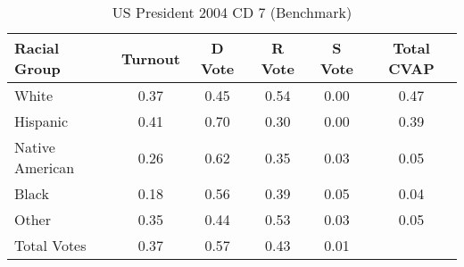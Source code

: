 \begin{table}[htb]
\begin{center}
\caption{US President 2004 CD 7 (Benchmark)}
\label{pres04_cvap_cd_7_benchmark}
\begin{tabular}{lccccc}
  \hline
Racial Group & Turnout & D Vote & R Vote & S Vote & Total CVAP \\ 
  \hline
White & 0.37 & 0.45 & 0.54 & 0.00 & 0.47 \\ 
  Hispanic & 0.41 & 0.70 & 0.30 & 0.00 & 0.39 \\ 
  Native American & 0.26 & 0.62 & 0.35 & 0.03 & 0.05 \\ 
  Black & 0.18 & 0.56 & 0.39 & 0.05 & 0.04 \\ 
  Other & 0.35 & 0.44 & 0.53 & 0.03 & 0.05 \\ 
  Total Votes & 0.37 & 0.57 & 0.43 & 0.01 &  \\ 
   \hline
\end{tabular}
\end{center}
\end{table}
